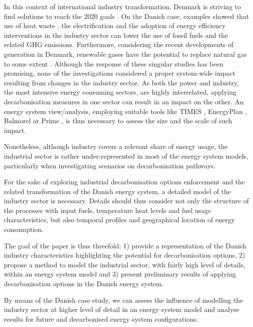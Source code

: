 \documentclass[review]{elsarticle}
\begin{document}
In this context of international industry transformation, Denmark is striving to find solutions to reach the 2020 goals \cite{EnergyCommission2017,Energikommissionen2017}. 
On the Danish case, examples showed that use of heat waste \cite{Buhler2017a}, the electrification \cite{DanishEnergyAgency2014a} and the adoption of energy efficiency interventions in the industry sector \cite{DEAeff18,Buhler2016} can lower the use of fossil fuels and the related GHG emissions. Furthermore, considering the recent developments of generation in Denmark, renewable gases have the potential to replace natural gas to some extent \cite{Schweitzer2017,Lise2017,Jensen2017}.
Although the response of these singular studies has been promising, none of the investigations considered a proper system-wide impact resulting from changes in the industry sector. 
As both the power and industry, the most intensive energy consuming sectors, are highly interrelated, applying decarbonisation measures in one sector can result in an impact on the other. 
An energy system view/analysis, employing suitable tools like TIMES \cite{IEA-ETSAP}, EnergyPlan \cite{DepartmentofDevelopmentandPlanning}, Balmorel \cite{balmorel} or Prime \cite{NationalTechnicalUniversityofAthens}, is thus necessary to assess the size and the scale of such impact.

Nonetheless, although industry covers a relevant share of energy usage, the industrial sector is rather under-represented in most of the energy system models, particularly when investigating scenarios on decarbonisation pathways.

For the sake of exploring industrial decarbonisation options enforcement and the related transformation of the Danish energy system, a detailed model of the industry sector is necessary. Details should thus consider not only the structure of the processes with input fuels, temperature heat levels and fuel usage characteristics, but also temporal profiles and geographical location of energy consumption.

The goal of the paper is thus threefold: 1) provide a representation of the Danish industry characteristics highlighting the potential for decarbonisation options, 2) propose a method to model the industrial sector, with fairly high level of details, within an energy system model and 3) present preliminary results of applying decarbonisation options in the Danish energy system.

By means of the Danish case study, we can assess the influence of modelling the industry sector at higher level of detail in an energy system model and analyse results for future and decarbonised energy system configurations. 
\end{document}
